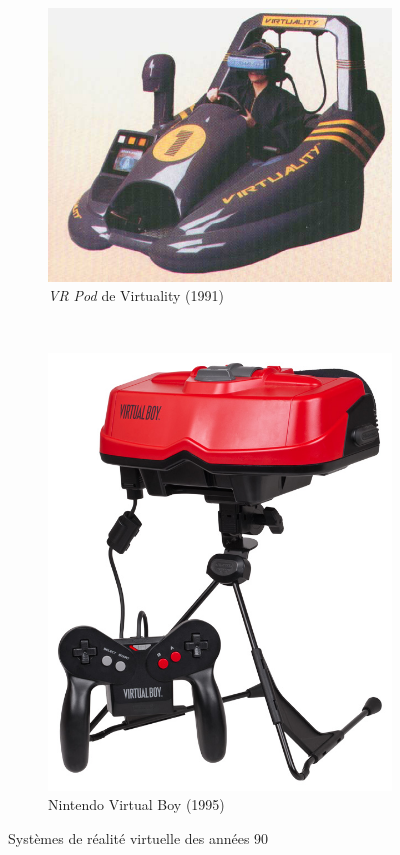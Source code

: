 \documentclass[a4]{scrartcl}
\begin{document}
\begin{figure}[!h]
	\centering
	\begin{subfigure}{.4\textwidth}
	  \centering
	  \includegraphics[width=\linewidth]{virtuality}
	  \caption{\emph{VR Pod} de Virtuality (1991)}
	\end{subfigure}
	~
	\begin{subfigure}{.4\textwidth}
	  \centering
	  \includegraphics[width=0.8\linewidth]{virtualboy}
	  \caption{Nintendo Virtual Boy (1995)}
	\end{subfigure}
 	\caption{Systèmes de réalité virtuelle des années 90}
\end{figure}
\end{document}
